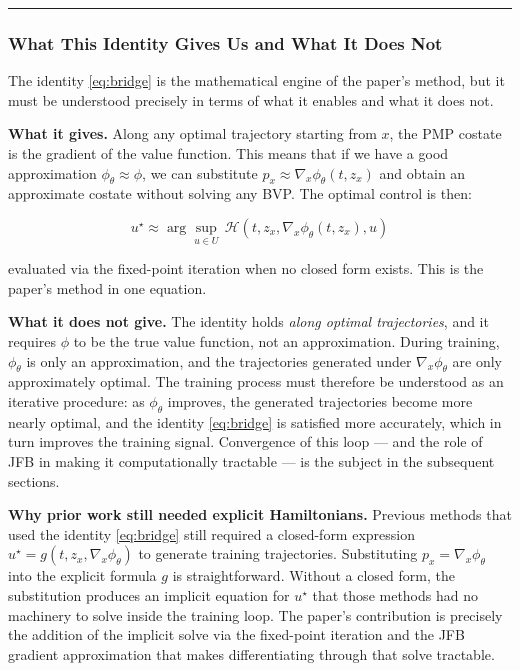 \documentclass{article}
\begin{document}
\medskip\hrule\medskip

\subsubsection{What This Identity Gives Us and What It Does Not}

The identity \eqref{eq:bridge} is the mathematical engine of the paper's method,
but it must be understood precisely in terms of what it enables and what it
does not.

\textbf{What it gives.} Along any optimal trajectory starting from $x$,
the PMP costate is the gradient of the value function. This means that if we
have a good approximation $\phi_\theta \approx \phi$, we can substitute
$p_x \approx \nabla_x \phi_\theta(t, z_x)$ and obtain an approximate costate
without solving any BVP. The optimal control is then:

\begin{equation}
    u^\star \approx \arg\sup_{u \in U}\,
    \mathcal{H}(t, z_x, \nabla_x\phi_\theta(t, z_x), u)
\end{equation}

evaluated via the fixed-point iteration when no closed form exists. This is the paper's
method in one equation.

\textbf{What it does not give.} The identity holds \textit{along optimal
trajectories}, and it requires $\phi$ to be the true value function, not an
approximation. During training, $\phi_\theta$ is only an approximation, and the
trajectories generated under $\nabla_x\phi_\theta$ are only approximately
optimal. The training process must therefore be understood as an iterative
procedure: as $\phi_\theta$ improves, the generated trajectories become more
nearly optimal, and the identity \eqref{eq:bridge} is satisfied more accurately,
which in turn improves the training signal. Convergence of this loop ---
and the role of JFB in making it computationally tractable --- is the subject
in the subsequent sections.

\textbf{Why prior work still needed explicit Hamiltonians.} Previous methods
that used the identity \eqref{eq:bridge} still required a closed-form expression
$u^\star = g(t, z_x, \nabla_x\phi_\theta)$ to generate training trajectories.
Substituting $p_x = \nabla_x\phi_\theta$ into the explicit formula $g$ is
straightforward. Without a closed form, the substitution produces an implicit
equation for $u^\star$ that those methods had no machinery to solve inside the
training loop. The paper's contribution is precisely the addition of the implicit
solve via the fixed-point iteration and the JFB gradient approximation that makes
differentiating through that solve tractable.
\end{document}
